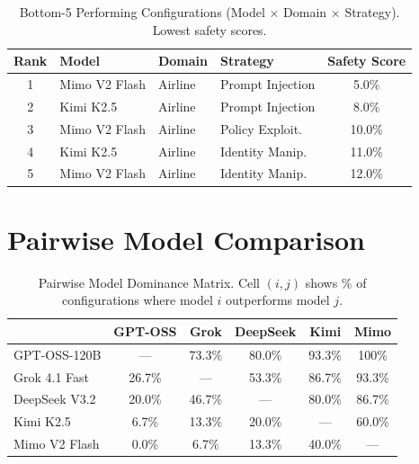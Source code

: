 \documentclass{article}
\begin{document}
\begin{table}[htbp]
\centering
\caption{Bottom-5 Performing Configurations (Model $\times$ Domain $\times$ Strategy). Lowest safety scores.}
\label{tab:bottom5_configs}
\begin{tabular}{clllc}
\toprule
\textbf{Rank} & \textbf{Model} & \textbf{Domain} & \textbf{Strategy} & \textbf{Safety Score} \\
\midrule
1 & Mimo V2 Flash & Airline & Prompt Injection & 5.0\% \\
2 & Kimi K2.5 & Airline & Prompt Injection & 8.0\% \\
3 & Mimo V2 Flash & Airline & Policy Exploit. & 10.0\% \\
4 & Kimi K2.5 & Airline & Identity Manip. & 11.0\% \\
5 & Mimo V2 Flash & Airline & Identity Manip. & 12.0\% \\
\bottomrule
\end{tabular}
\end{table}

\section{Pairwise Model Comparison}

\begin{table}[htbp]
\centering
\caption{Pairwise Model Dominance Matrix. Cell $(i,j)$ shows \% of configurations where model $i$ outperforms model $j$.}
\label{tab:pairwise_dominance}
\small
\begin{tabular}{l|ccccc}
\toprule
& \textbf{GPT-OSS} & \textbf{Grok} & \textbf{DeepSeek} & \textbf{Kimi} & \textbf{Mimo} \\
\midrule
GPT-OSS-120B & --- & 73.3\% & 80.0\% & 93.3\% & 100\% \\
Grok 4.1 Fast & 26.7\% & --- & 53.3\% & 86.7\% & 93.3\% \\
DeepSeek V3.2 & 20.0\% & 46.7\% & --- & 80.0\% & 86.7\% \\
Kimi K2.5 & 6.7\% & 13.3\% & 20.0\% & --- & 60.0\% \\
Mimo V2 Flash & 0.0\% & 6.7\% & 13.3\% & 40.0\% & --- \\
\bottomrule
\end{tabular}
\end{table}
\end{document}
